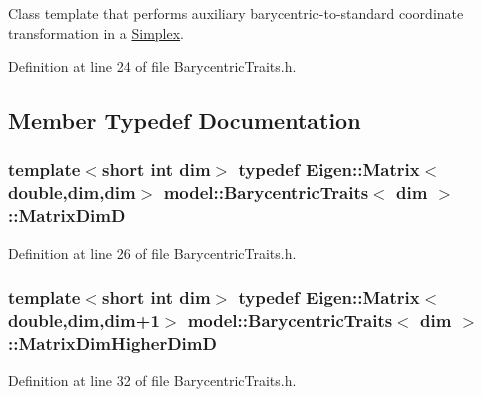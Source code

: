 Class template that performs auxiliary barycentric-\/to-\/standard coordinate transformation in a \hyperlink{classmodel_1_1_simplex}{Simplex}. 

Definition at line 24 of file Barycentric\+Traits.\+h.



\subsection{Member Typedef Documentation}
\hypertarget{structmodel_1_1_barycentric_traits_a40fdf63235669f5a7697b19130782975}{}
\subsubsection[{Matrix\+Dim\+D}]{\setlength{\rightskip}{0pt plus 5cm}template$<$short int dim$>$ typedef Eigen\+::\+Matrix$<$double,{\bf dim},{\bf dim}$>$ {\bf model\+::\+Barycentric\+Traits}$<$ {\bf dim} $>$\+::{\bf Matrix\+Dim\+D}}\label{structmodel_1_1_barycentric_traits_a40fdf63235669f5a7697b19130782975}


Definition at line 26 of file Barycentric\+Traits.\+h.

\hypertarget{structmodel_1_1_barycentric_traits_a2c6fbdc726cddd2ee8e5e10695aeeb58}{}
\subsubsection[{Matrix\+Dim\+Higher\+Dim\+D}]{\setlength{\rightskip}{0pt plus 5cm}template$<$short int dim$>$ typedef Eigen\+::\+Matrix$<$double,{\bf dim},{\bf dim}+1$>$ {\bf model\+::\+Barycentric\+Traits}$<$ {\bf dim} $>$\+::{\bf Matrix\+Dim\+Higher\+Dim\+D}}\label{structmodel_1_1_barycentric_traits_a2c6fbdc726cddd2ee8e5e10695aeeb58}


Definition at line 32 of file Barycentric\+Traits.\+h.

\hypertarget{structmodel_1_1_barycentric_traits_a90e0d5eb84d856af28e250bbb11f2ced}{}
